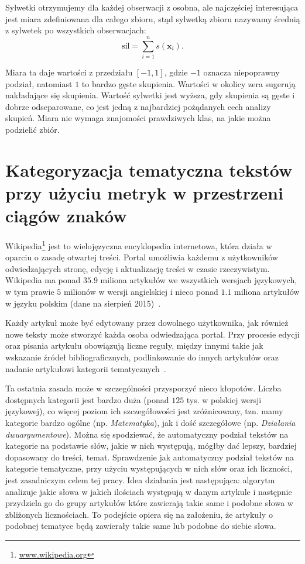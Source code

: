 \documentclass{praca1}
\begin{document}
Sylwetki otrzymujemy dla każdej obserwacji z osobna, ale najczęściej interesująca jest miara zdefiniowana dla całego zbioru, stąd sylwetką zbioru nazywamy średnią z sylwetek po wszystkich obserwacjach:
\begin{equation*}
\mathrm{sil} = \sum\limits_{i=1}^{n}s(\mathbf{x}_i).
\end{equation*}

Miara ta daje wartości z przedziału $[-1, 1]$, gdzie $-1$ oznacza niepoprawny podział, natomiast $1$ to bardzo gęste skupienia. Wartości w okolicy zera sugerują nakładające się skupienia. Wartość sylwetki jest wyższa, gdy skupienia są gęste i dobrze odseparowane, co jest jedną z najbardziej pożądanych cech analizy skupień. Miara nie wymaga znajomości prawdziwych klas, na jakie można podzielić zbiór.



\chapter{Kategoryzacja tematyczna tekstów przy użyciu metryk w przestrzeni ciągów znaków}

Wikipedia\footnote{\url{www.wikipedia.org}} jest to wielojęzyczna encyklopedia internetowa, która działa w oparciu o zasadę otwartej treści. Portal umożliwia każdemu z użytkowników odwiedzających stronę, edycję i aktualizację treści w czasie rzeczywistym. Wikipedia ma ponad $35.9$ miliona artykułów we wszystkich wersjach językowych, w tym prawie $5$ milionów w wersji angielskiej i nieco ponad $1.1$ miliona artykułów w języku polskim (dane na sierpień 2015)~\cite{wiki}.

Każdy artykuł może być edytowany przez dowolnego użytkownika, jak również nowe teksty może stworzyć każda osoba odwiedzająca portal. Przy procesie edycji oraz pisania artykułu obowiązują liczne reguły, między innymi takie jak wskazanie źródeł bibliograficznych, podlinkowanie do innych artykułów oraz nadanie artykułowi kategorii tematycznych~\cite{wiki}. 

Ta ostatnia zasada może w szczególności przysporzyć nieco kłopotów. Liczba dostępnych kategorii jest bardzo duża (ponad $125$ tys. w polskiej wersji językowej), co więcej poziom ich szczegółowości jest zróżnicowany, tzn. mamy kategorie bardzo ogólne (np. \emph{Matematyka}), jak i dość szczegółowe (np. \emph{Działania dwuargumentowe}). Można się spodziewać, że automatyczny podział tekstów na kategorie na podstawie słów, jakie w nich występują, mógłby dać lepszy, bardziej dopasowany do treści, temat. Sprawdzenie jak automatyczny podział tekstów na kategorie tematyczne, przy użyciu występujących w nich słów oraz ich liczności, jest zasadniczym celem tej pracy. Idea działania jest następująca: algorytm analizuje jakie słowa w jakich ilościach występują w danym artykule i następnie przydziela go do grupy artykułów które zawierają takie same i podobne słowa w zbliżonych licznościach. To podejście opiera się na założeniu, że artykuły o podobnej tematyce będą zawierały takie same lub podobne do siebie słowa. 
\end{document}
